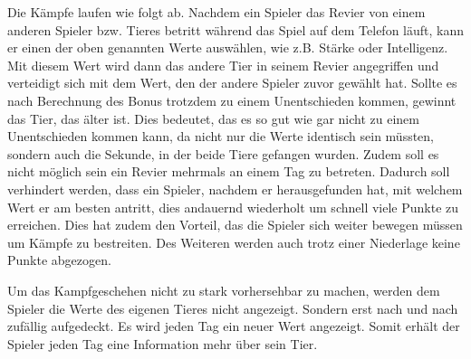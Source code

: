 Die Kämpfe laufen wie folgt ab. Nachdem ein Spieler das Revier von einem anderen Spieler bzw. Tieres betritt während das Spiel auf dem Telefon läuft, kann er einen der oben genannten Werte auswählen, wie z.B. Stärke oder Intelligenz. Mit diesem Wert wird dann das andere Tier in seinem Revier angegriffen und verteidigt sich mit dem Wert, den der andere Spieler zuvor gewählt hat. Sollte es nach Berechnung des Bonus trotzdem zu einem Unentschieden kommen, gewinnt das Tier, das älter ist. Dies bedeutet, das es so gut wie gar nicht zu einem Unentschieden kommen kann, da nicht nur die Werte identisch sein müssten, sondern auch die Sekunde, in der beide Tiere gefangen wurden. Zudem soll es nicht möglich sein ein Revier mehrmals an einem Tag zu betreten. Dadurch soll verhindert werden, dass ein Spieler, nachdem er herausgefunden hat, mit welchem Wert er am besten antritt, dies andauernd wiederholt um schnell viele Punkte zu erreichen. Dies hat zudem den Vorteil, das die Spieler sich weiter bewegen müssen um Kämpfe zu bestreiten. Des Weiteren werden auch trotz einer Niederlage keine Punkte abgezogen. 

Um das Kampfgeschehen nicht zu stark vorhersehbar zu machen, werden dem Spieler die Werte des eigenen Tieres nicht angezeigt. Sondern erst nach und nach zufällig aufgedeckt. Es wird jeden Tag ein neuer Wert angezeigt. Somit erhält der Spieler jeden Tag eine Information mehr über sein Tier.

